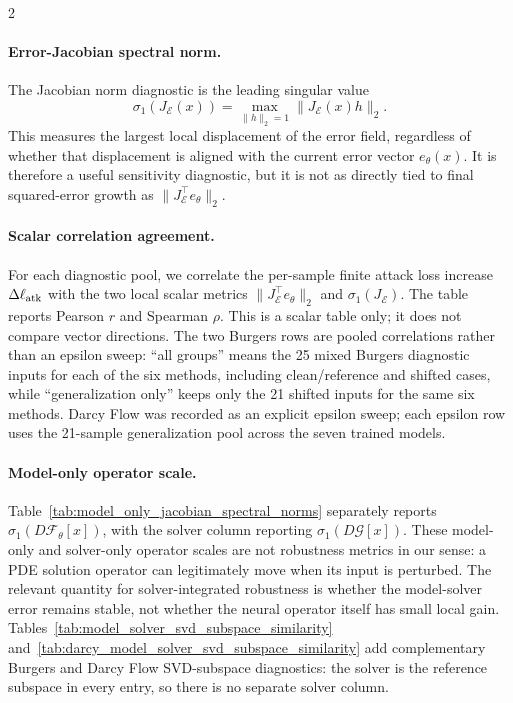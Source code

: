 ﻿\documentclass[letterpaper]{article} %
\newcommand{\tabref}[1]{Table~\ref{#1}}
\begin{document}
\begin{multicols}{2}
\paragraph{Error-Jacobian spectral norm.}
The Jacobian norm diagnostic is the leading singular value
\[
  \sigma_1(J_{\mathcal E}(x))
  =
  \max_{\|h\|_2=1}\|J_{\mathcal E}(x)h\|_2 .
\]
This measures the largest local displacement of the error field, regardless of
whether that displacement is aligned with the current error vector
\(e_\theta(x)\).  It is therefore a useful sensitivity diagnostic, but it is not
as directly tied to final squared-error growth as
\(\|J_{\mathcal E}^{\top}e_\theta\|_2\).

\paragraph{Scalar correlation agreement.}
For each diagnostic pool, we correlate the per-sample finite attack loss
increase \(\Delta\ell_{\rm atk}\) with the two local scalar metrics
\(\|J_{\mathcal E}^{\top}e_\theta\|_2\) and
\(\sigma_1(J_{\mathcal E})\).  The table reports Pearson \(r\) and Spearman
\(\rho\).  This is a scalar table only; it does not compare vector directions.
The two Burgers rows are pooled correlations rather than an epsilon sweep:
``all groups'' means the 25 mixed Burgers diagnostic inputs for each of the six
methods, including clean/reference and shifted cases, while ``generalization
only'' keeps only the 21 shifted inputs for the same six methods.  Darcy Flow
was recorded as an explicit epsilon sweep; each epsilon row uses the 21-sample
generalization pool across the seven trained models.

\paragraph{Model-only operator scale.}
\tabref{tab:model_only_jacobian_spectral_norms} separately reports
\(\sigma_1(D\mathcal{F}_\theta[x])\), with the solver column reporting
\(\sigma_1(D\mathcal{G}[x])\).  These model-only and solver-only operator
scales are not robustness metrics in our sense: a PDE solution operator can
legitimately move when its input is perturbed.  The relevant quantity for
solver-integrated robustness is whether the model-solver error remains stable,
not whether the neural operator itself has small local gain.
Tables~\ref{tab:model_solver_svd_subspace_similarity}
and~\ref{tab:darcy_model_solver_svd_subspace_similarity} add complementary
Burgers and Darcy Flow SVD-subspace diagnostics: the solver is the reference
subspace in every entry, so there is no separate solver column.

\end{multicols}
\end{document}
